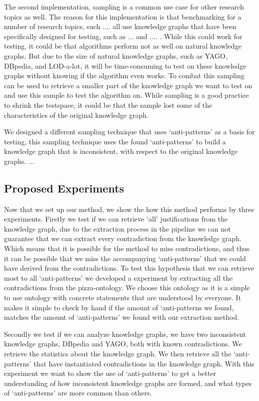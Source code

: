 \documentclass{article}
\begin{document}
The second implementation, sampling is a common use case for other research topics as well. The reason for this implementation is that benchmarking for a number of research topics, such .... all use knowledge graphs that have been specifically designed for testing, such as ... and  .... . While this could work for testing, it could be that algorithms perform not as well on natural knowledge graphs. But due to the size of natural knowledge graphs, such as YAGO, DBpedia, and LOD-a-lot, it will be time-consuming to test on these knowledge graphs without knowing if the algorithm even works. To combat this sampling can be used to retrieve a smaller part of the knowledge graph we want to test on and use this sample to test the algorithm on. While sampling is a good practice to shrink the testspace, it could be that the sample lost some of the characteristics of the original knowledge graph. 

We designed a different sampling technique that uses `anti-patterns' as a basis for testing, this sampling technique uses the found `anti-patterns' to build a knowledge graph that is inconsistent, with respect to the original knowledge graphs. ...

\subsection{Proposed Experiments}
Now that we set up our method, we show the how this method performs by three experiments. 
Firstly we test if we can retrieve `all' justifications from the knowledge graph, due to the extraction process in the pipeline we can not guarantee that we can extract every contradiction from the knowledge graph. Which means that it is possible for the method to miss contradictions, and thus it can be possible that we miss the accompanying `anti-patterns' that we could have derived from the contradictions. To test this hypothesis that we can retrieve most to all `anti-patterns' we developed a experiment by extracting all the contradictions from the pizza-ontology. We choose this ontology as it is a simple to use ontology with concrete statements that are understood by everyone. It makes it simple to check by hand if the amount of `anti-patterns we found, matches the amount of `anti-patterns' we found with our extraction method.

Secondly we test if we can analyze knowledge graphs, we have two inconsistent knowledge graphs, DBpedia and YAGO, both with known contradictions. We retrieve the statistics about the knowledge graph. We then retrieve all the `anti-patterns' that have instantiated contradictions in the knowledge graph. 
With this experiment we want to show the use of `anti-patterns' to get a better understanding of how inconsistent knowledge graphs are formed, and what types of `anti-patterns' are more common than others.
\end{document}
